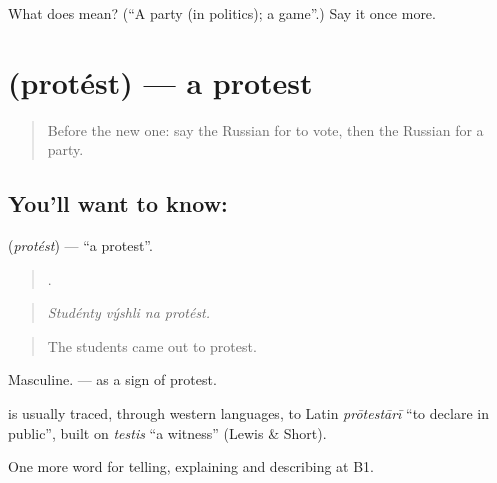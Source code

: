 \begin{tcolorbox}[breakable,colback=teal!4,colframe=teal!35!black,title={Before you move on}]
What does  mean? (\textquotedblleft{}A party (in politics); a game\textquotedblright{}.) Say it once more.
\end{tcolorbox}
\section[\texorpdfstring{\ru{протест} (protést)}{протест (protést)}]{ (protést) — a protest}

\label{lesson:RU-C366-protest}



\begin{quote}
Before the new one: say the Russian for to vote, then the Russian for a party.
\end{quote}

\subsection*{You'll want to know: }
\textbf{} (\emph{protést}) — \textquotedblleft{}a protest\textquotedblright{}.

\begin{quote}
   .
\end{quote}

\begin{quote}
\emph{Studénty výshli na protést.}
\end{quote}

\begin{quote}
The students came out to protest.
\end{quote}

Masculine. \emph{  } — as a sign of protest.

\begin{cousinweb}
\textbf{} is usually traced, through western languages, to Latin \emph{prōtestārī} \textquotedblleft{}to declare in public\textquotedblright{}, built on \emph{testis} \textquotedblleft{}a witness\textquotedblright{} (Lewis \& Short).
\end{cousinweb}

\begin{grammarlens}[title={What you've built}]
One more word for telling, explaining and describing at B1.
\end{grammarlens}

